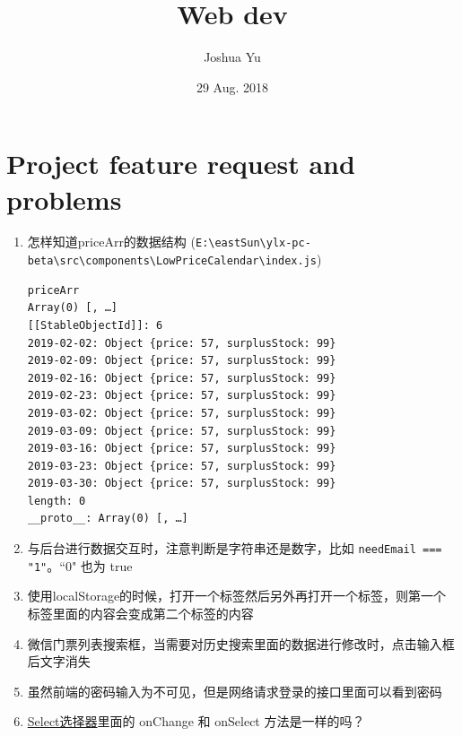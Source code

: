 \documentclass[a4paper, 12pt]{article}
\begin{document}

\large
\title{Web dev}
\author{Joshua Yu}
\date{29 Aug. 2018}
\maketitle
\tableofcontents


\section{Project feature request and problems}
\begin{enumerate}

\item 怎样知道priceArr的数据结构 (\verb|E:\eastSun\ylx-pc-beta\src\components|\linebreak \verb|\LowPriceCalendar\index.js|)
\begin{verbatim}
priceArr
Array(0) [, …]
[[StableObjectId]]: 6
2019-02-02: Object {price: 57, surplusStock: 99}
2019-02-09: Object {price: 57, surplusStock: 99}
2019-02-16: Object {price: 57, surplusStock: 99}
2019-02-23: Object {price: 57, surplusStock: 99}
2019-03-02: Object {price: 57, surplusStock: 99}
2019-03-09: Object {price: 57, surplusStock: 99}
2019-03-16: Object {price: 57, surplusStock: 99}
2019-03-23: Object {price: 57, surplusStock: 99}
2019-03-30: Object {price: 57, surplusStock: 99}
length: 0
__proto__: Array(0) [, …]
\end{verbatim}

\item 与后台进行数据交互时，注意判断是字符串还是数字，比如 \verb|needEmail === "1"|。``0" 也为 true

\item 使用localStorage的时候，打开一个标签然后另外再打开一个标签，则第一个标签里面的内容会变成第二个标签的内容

\item 微信门票列表搜索框，当需要对历史搜索里面的数据进行修改时，点击输入框后文字消失

\item 虽然前端的密码输入为不可见，但是网络请求登录的接口里面可以看到密码

\item \href{https://ant.design/components/select-cn/}{Select选择器}里面的 onChange 和 onSelect 方法是一样的吗？

\end{enumerate}
\end{document}
